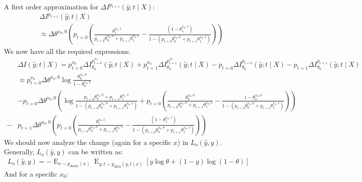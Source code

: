 \documentclass[oneside,12pt]{article}
\begin{document}
%
A first order approximation for $\Delta I^{p_{t=1}}(\hat{y};t \mid X)$:
%
\begin{equation*}
    \begin{split}
    &\Delta I^{p_{t=1}}(\hat{y};t \mid X) \\
    &\approx \Delta\theta^{x_0,0}\left(p_{t=0}\left(\frac{\theta_1^{x_0,1}}{p_{t=0}\theta_0^{x_0,0} +p_{t=1}\theta_1^{x_0,1}}-\frac{(1-\theta_1^{x_0,1})}{1-(p_{t=0}\theta_0^{x_0,0}+p_{t=1}\theta_1^{x_0,1})}\right)\right)
        \end{split}
\end{equation*}
%
We now have all the required expressions.
\begin{equation*}
    \begin{split}
        &\Delta I(\hat{y};t \mid X) = p^{x_0}_{t=0}\Delta I^{p^{x_0}_{t=0}}_{\theta_0}(\hat{y};t \mid X) + p^{x_0}_{t=1}\Delta I^{p^{x_0}_{t=1}}_{\theta_0}(\hat{y};t \mid X) - p_{t=0}\Delta I^{p_{t=0}}_{\theta_0}(\hat{y};t \mid X) - p_{t=1}\Delta I^{p_{t=1}}_{\theta_0}(\hat{y};t \mid X)\\
        &\approx p^{x_0}_{t=0}\Delta\theta^{x_0,0} \operatorname{log}\frac{\theta_0^{x_0,0}}{1-\theta_0^{x_0,0}}\\
        &- p_{t=0}\Delta\theta^{x_0,0}\left(\operatorname{log}\frac{p_{t=0}\theta_0^{x_0,0}+p_{t=1}\theta_1^{x_0,1}}{1-(p_{t=0}\theta_0^{x_0,0}+p_{t=1}\theta_1^{x_0,1})}+ p_{t=0}\left(
        \frac{\theta_0^{x_0,0}}{p_{t=0}\theta_0^{x_0,0}+p_{t=1}\theta_1^{x_0,1}} - \frac{1-\theta_0^{x_0,0}}{1-(p_{t=0}\theta_0^{x_0,0}+p_{t=1}\theta_1^{x_0,1})}\right)\right)\\ 
        -& p_{t=1}\Delta\theta^{x_0,0}\left(p_{t=0}\left(\frac{\theta_1^{x_0,1}}{p_{t=0}\theta_0^{x_0,0} +p_{t=1}\theta_1^{x_0,1}}-\frac{(1-\theta_1^{x_0,1})}{1-(p_{t=0}\theta_0^{x_0,0}+p_{t=1}\theta_1^{x_0,1})}\right)\right)
    \end{split}
\end{equation*}
%
We should now analyze the change (again for a specific $x$) in $L_o(\hat{y}, y)$. Generally, $L_o(\hat{y}, y)$ can be written as:
\begin{equation}
    \begin{split}
        L_o(\hat{y}, y) = -\operatorname{E}_{x \sim p_{daata}(x)} \operatorname{E}_{y,t \sim p_{data}(y,t \mid x)}\left[y \operatorname{log}\theta + (1-y)\operatorname{log}(1-\theta)\right]
    \end{split}
\end{equation}
%
And for a specific $x_0$:
%
\end{document}
